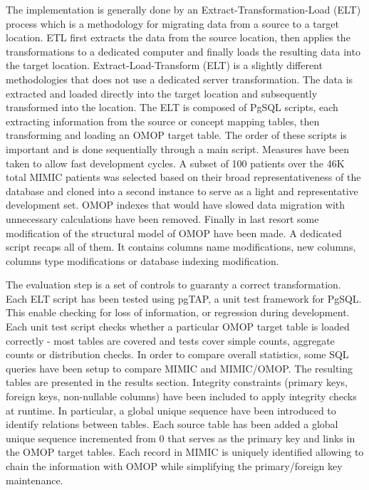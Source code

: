 The implementation is generally done by an Extract-Transformation-Load (ELT)
process which is a methodology for migrating data from a source to a target
location. ETL first extracts the data from the source location, then applies
the transformations to a dedicated computer and finally loads the resulting
data into the target location. Extract-Load-Transform (ELT) is a slightly
different methodologies that does not use a dedicated server transformation.
The data is extracted and loaded directly into the target location and
subsequently transformed into the location. The ELT is composed of PgSQL
scripts, each extracting information from the source or concept mapping tables,
then transforming and loading an OMOP target table. The order of these scripts
is important and is done sequentially through a main script. 
Measures have been taken to allow fast development cycles. A subset of 100
patients over the 46K total MIMIC patients was selected based on their broad
representativeness of the database and cloned into a second instance to serve
as a light and representative development set. OMOP indexes that would have
slowed data migration with unnecessary calculations have been removed.
Finally in last resort some modification of the structural model of OMOP have
been made. A dedicated script recaps all of them. It contains columns name
modifications, new columns, columns type modifications or database indexing
modification.

The evaluation step is a set of controls to guaranty a correct transformation.
Each ELT script has been tested using pgTAP, a unit test framework for PgSQL.
This enable checking for loss of information, or regression during development.
Each unit test script checks whether a particular OMOP target table is loaded
correctly - most tables are covered and tests cover simple counts, aggregate
counts or distribution checks.
In order to compare overall statistics, some SQL queries have been setup to
compare MIMIC and MIMIC/OMOP. The resulting tables are presented in the results
section. Integrity constraints (primary keys, foreign keys, non-nullable
columns) have been included to apply integrity checks at runtime. 
In particular, a global unique sequence have been introduced to identify
relations between tables. Each source table has been added a global unique
sequence incremented from 0 that serves as the primary key and links in the
OMOP target tables. Each record in MIMIC is uniquely identified allowing to
chain the information with OMOP while simplifying the primary/foreign key
maintenance.
\\


